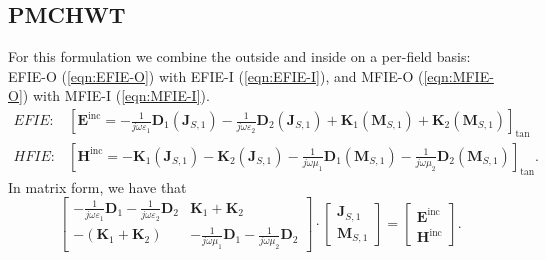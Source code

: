 \documentclass[a4paper,10pt]{book}
\newcommand{\field}[1]{\mathbf{#1}}
\newcommand{\current}[1]{\mathbf{#1}}
\newcommand{\operator}[1]{\mathbf{#1}}
\begin{document}
\subsection{PMCHWT}
%
\par
For this formulation we combine the outside and inside on a per-field basis: EFIE-O (\ref{eqn:EFIE-O}) with EFIE-I (\ref{eqn:EFIE-I}), and MFIE-O (\ref{eqn:MFIE-O}) with MFIE-I (\ref{eqn:MFIE-I}).
\begin{eqnarray}
EFIE: & \boxed{
\left[\field{E}^\text{inc} =  -\frac{1}{j \omega \varepsilon_1} \operator{D}_{1}\left(\current{J}_{S,1}\right) - \frac{1}{j \omega \varepsilon_2} \operator{D}_{2}\left(\current{J}_{S,1}\right) + \operator{K}_{1}\left(\current{M}_{S,1}\right) + \operator{K}_{2}\left(\current{M}_{S,1}\right) \right]_\text{tan} } \\
HFIE: & \boxed{
\left[\field{H}^\text{inc} = - \operator{K}_{1}\left(\current{J}_{S,1}\right) - \operator{K}_{2}\left(\current{J}_{S,1}\right) - \frac{1}{j \omega \mu_1}\operator{D}_{1}\left(\current{M}_{S,1}\right) - \frac{1}{j \omega \mu_2}\operator{D}_{2}\left(\current{M}_{S,1}\right)  \right]_\text{tan} }.
\end{eqnarray}
In matrix form, we have that
\begin{equation}
\left[
\begin{matrix}
  -\frac{1}{j \omega \varepsilon_1} \operator{D}_{1} - \frac{1}{j \omega \varepsilon_2} \operator{D}_{2} & \operator{K}_{1} + \operator{K}_{2} \\
  -\left(\operator{K}_{1} + \operator{K}_{2} \right) & - \frac{1}{j \omega \mu_1}\operator{D}_{1} - \frac{1}{j \omega \mu_2}\operator{D}_{2}
\end{matrix}
\right]
\cdot 
\left[
\begin{matrix}
  \current{J}_{S,1} \\
  \current{M}_{S,1}  
\end{matrix}
\right]
=
\left[
\begin{matrix}
  \field{E}^\text{inc} \\
  \field{H}^\text{inc}
\end{matrix}
\right].
\end{equation}
\end{document}
